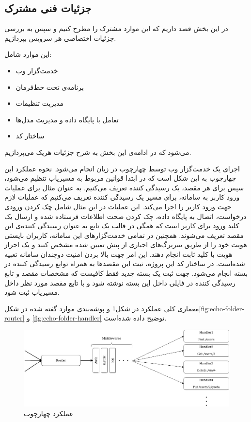 \subsection{جزئیات فنی مشترک}
در این بخش قصد داریم که این موارد مشترک را مطرح کنیم و سپس به بررسی جزئیات اختصاصی هر سرویس بپردازیم.

این موارد شامل:

\begin{itemize}
	\item خدمت‌گزار وب
	\item برنامه‌ی تحت خط‌‌فرمان
	\item مدیریت تنظیمات
	\item تعامل با پایگاه داده و مدیریت مدل‌ها
	\item ساختار کد
\end{itemize}
می‌شود که در ادامه‌ی این بخش به شرح جزئیات هر‌یک می‌پردازیم.


اجرای یک خدمت‌گزار وب توسط چهارچوب  در زبان  انجام می‌شود. نحوه عملکرد این چهارچوب به این شکل است که در ابتدا قوانین مربوط به مسیریاب تنظیم می‌شود، سپس برای هر مقصد، یک رسیدگی کننده تعریف می‌کنیم. به عنوان مثال برای عملیات ورود کاربر به سامانه، برای مسیر  یک رسیدگی کننده تعریف می‌کنیم که عملیات لازم جهت ورود کاربر را اجرا می‌کند. این عملیات در این مثال شامل چک کردن ورودی درخواست، اتصال به پایگاه داده، چک کردن صحت اطلاعات فرستاده شده و ارسال یک کلید ورود برای کاربر است که همگی در قالب یک تابع به عنوان رسیدگی کننده‌ی این مقصد تعریف می‌شوند. همچنین در تمامی خدمت‌گزار‌های این سامانه، کاربران بایستی هویت خود را از طریق سربرگ‌های اجباری از پیش تعیین شده مشخص کنند و یک احراز هویت با کلید ثابت انجام دهند. این امر جهت بالا بردن امنیت دوچندان سامانه تعبیه شده‌است.
در ساختار کد این پروژه، ثبت این مقصدها به همراه توابع رسیدگی کننده در بسته  انجام می‌شود. جهت ثبت یک بسته جدید فقط کافیست که مشخصات مقصد و تابع رسیدگی کننده در فایلی داخل این بسته نوشته شود و با تابع  مقصد مورد نظر داخل مسیریاب  ثبت شود.

معماری کلی عملکرد  در شکل\ref{fig:echo-workflow} و پوشه‌بندی موارد گفته شده در شکل\ref{fig:echo-folder-router} و \ref{fig:echo-folder-handler} توضیح داده شده‌است.

\begin{figure}
	\centering
	\includegraphics[scale=0.45]{figures/echo-workflow.jpeg}
	\caption{عملکرد چهارچوب }
	\label{fig:echo-workflow}
\end{figure}

